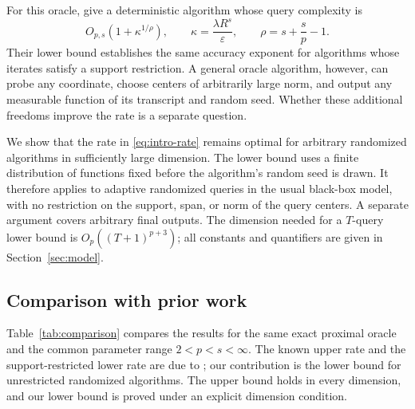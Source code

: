 \documentclass[11pt]{article}
\theoremstyle{definition}
\theoremstyle{remark}
\newcommand{\eps}{\varepsilon}
\begin{document}
For this oracle, \citet[Theorem~4]{ABJS} give a deterministic algorithm
whose query complexity is
\begin{equation}\label{eq:intro-rate}
O_{p,s}\!\left(1+\kappa^{1/\rho}\right),
\qquad
\kappa=\frac{\lambda R^s}{\eps},
\qquad
\rho=s+\frac{s}{p}-1.
\end{equation}
Their lower bound establishes the same accuracy exponent for algorithms
whose iterates satisfy a support restriction. A general oracle algorithm,
however, can probe any coordinate, choose centers of arbitrarily large
norm, and output any measurable function of its transcript and random seed.
Whether these additional freedoms improve the rate is a separate question.

We show that the rate in \eqref{eq:intro-rate} remains optimal for arbitrary
randomized algorithms in sufficiently large dimension. The lower bound
uses a finite distribution of functions fixed before the algorithm's
random seed is drawn. It therefore applies to adaptive randomized queries
in the usual black-box model, with no restriction on the support, span,
or norm of the query centers. A separate argument covers arbitrary final
outputs. The dimension needed for a $T$-query lower bound is
$O_p((T+1)^{p+3})$; all constants and quantifiers are given in
Section~\ref{sec:model}.

\subsection{Comparison with prior work}\label{sec:related}

Table~\ref{tab:comparison} compares the results for the same exact
proximal oracle and the common parameter range $2<p<s<\infty$.
The known upper rate and the support-restricted lower rate are due to
\citet{ABJS}; our contribution is the lower bound for unrestricted
randomized algorithms. The upper bound holds in every dimension, and
our lower bound is proved under an explicit dimension condition.
\end{document}
